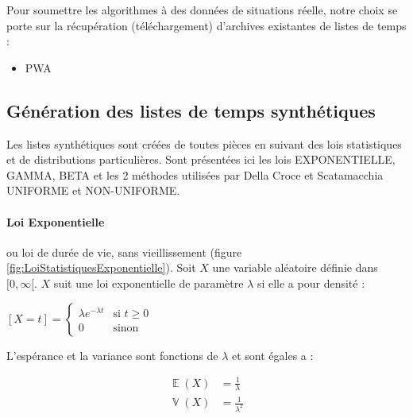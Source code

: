 \documentclass[a4paper,12pt]{report}
\DeclareMathOperator{\E}{\mathbb{E}} %
\DeclareMathOperator{\V}{\mathbb{V}} %
\theoremstyle{plain}				%
\theoremstyle{definition}				%
\newcommand\dcs{Della Croce et Scatamacchia\xspace}
\begin{document}
Pour soumettre les algorithmes à des données de situations réelle, notre choix se porte sur la récupération (téléchargement) d'archives existantes de listes de temps :
\begin{itemize}
	\item PWA
\end{itemize}


\subsection{Génération des listes de temps synthétiques}\label{ssec:instancesGenerationListesTempsSynthetiques}
Les listes synthétiques sont créées de toutes pièces en suivant des lois statistiques et de distributions particulières. Sont présentées ici les lois EXPONENTIELLE, GAMMA, BETA et les 2 méthodes utilisées par \dcs UNIFORME et NON-UNIFORME.

\bigskip
\paragraph{Loi Exponentielle} 
ou loi de durée de vie, sans vieillissement (figure \ref{fig:LoiStatistiquesExponentielle}).
Soit $X$ une variable aléatoire définie dans $[0, \infty[$. $X$ suit une loi exponentielle de paramètre $\lambda$ si elle a pour densité :


  \begin{center}
  $[X=t] = \left\{
    \begin{array}{ll}
        \lambda e^{-\lambda t}  & \mbox{si } t \geq 0  \\
        0 & \mbox{sinon}
    \end{array}
	\right.$
  \label{definitionLoiExponentielleDensite}
  \end{center}

L’espérance et la variance sont fonctions de $\lambda$ et sont égales a :

\begin{align*}
	\E(X) &= \frac{1}{\lambda} \\
	\V(X) &= \frac{1}{\lambda ^2}
\end{align*} 
\end{document}
